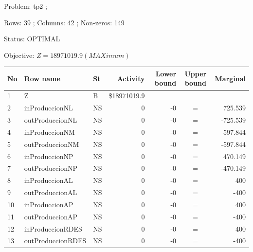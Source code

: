 \documentclass[a4paper,10pt]{article}
\begin{document}
Problem:     tp2 ;

Rows:        39  ; Columns:     42 ; Non-zeros:   149 

Status:      OPTIMAL 

Objective:   $Z    =   18971019.9    (MAXimum) $

\begin{flushleft}
 
 \begin{tabular}{| l  l  l  r  r  c  r |}
    \hline
    No  &  Row name &     St &     Activity &       Lower bound &     Upper bound &      Marginal  \\ \hline
    \hline
      1 &   Z &              B &       \$18971019.9 &               &			&		 \\ 
      2 &   inProduccionNL &         NS &               0 &              -0 &               = &         725.539  \\ 
      3 &   outProduccionNL &      NS &               0 &              -0 &               = &           -725.539 \\ 
      4 &   inProduccionNM &         NS &               0 &              -0 &               = &         597.844 \\ 
      5 &   outProduccionNM &      NS &               0 &              -0 &               = &           -597.844 \\ 
      6 &   inProduccionNP &         NS &               0 &              -0 &               = &         470.149 \\ 
      7 &   outProduccionNP &      NS &               0 &              -0 &               = &           -470.149 \\ 
      8 &   inProduccionAL &         NS &               0 &              -0 &               = &             400 \\ 
      9 &   outProduccionAL &      NS &               0 &              -0 &               = &           -400 \\ 
     10 &   inProduccionAP &         NS &               0 &              -0 &               = &             400 \\ 
     11 &   outProduccionAP &      NS &               0 &              -0 &               = &           -400 \\ 
     12 &   inProduccionRDES &       NS &               0 &              -0 &               = &             400 \\ 
     13 &   outProduccionRDES &    NS &               0 &              -0 &               = &           -400 \\ 

\end{tabular}
\end{flushleft}
\end{document}
